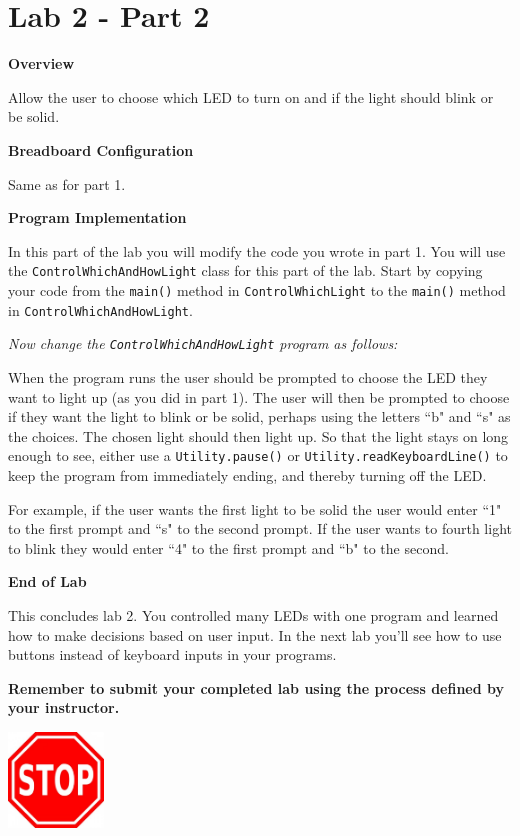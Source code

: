 \section{Lab 2 - Part 2}

\textbf{Overview}

Allow the user to choose which LED to turn on and if the light should blink or be solid.

\textbf{Breadboard Configuration}

Same as for part 1.

\textbf{Program Implementation}

In this part of the lab you will modify the code you wrote in part 1. You will use the \texttt{ControlWhichAndHowLight} class for this part of the lab. Start by copying your code from the \texttt{main()} method in \texttt{ControlWhichLight} to the \texttt{main()} method in \texttt{ControlWhichAndHowLight}. 

\textit{Now change the \texttt{ControlWhichAndHowLight} program as follows:}

When the program runs the user should be prompted to choose the LED they want to light up (as you did in part 1). The user will then be prompted to choose if they want the light to blink or be solid, perhaps using the letters ``b" and ``s" as the choices. The chosen light should then light up. So that the light stays on long enough to see, either use a \texttt{Utility.pause()} or \texttt{Utility.readKeyboardLine()} to keep the program from immediately ending, and thereby turning off the LED.

For example, if the user wants the first light to be solid the user would enter ``1" to the first prompt and ``s" to the second prompt. If the user wants to fourth light to blink they would enter ``4" to the first prompt and ``b" to the second.

\textbf{End of Lab}

This concludes lab 2. You controlled many LEDs with one program and learned how to make decisions based on user input. In the next lab you'll see how to use buttons instead of keyboard inputs in your programs.

\textbf{Remember to submit your completed lab using the process defined by your instructor.}

{\centering
	\beforefig
	\centerline{\includegraphics[height=1in]{pi_images/stop_sign_clip_art_16252.jpg}}
	\afterfig
}

